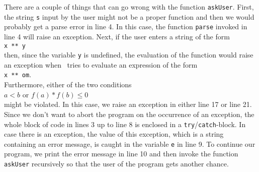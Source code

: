 There are a couple of things that can go wrong with the function \texttt{askUser}.  First,
the string \texttt{s} input by the user might not be a proper function and then
we would probably get a parse error in line 4.  In this case, the function \texttt{parse}
invoked in line 4 will raise an exception. Next, if the user enters a string of the form
\\[0.2cm]
\hspace*{1.3cm}
\texttt{x ** y}
\\[0.2cm]
then, since the variable \texttt{y} is undefined, the evaluation of the function would
raise an exception when \setlx\ tries to evaluate an expression of the form
\\[0.2cm]
\hspace*{1.3cm}
\texttt{x ** om}.
\\[0.2cm]
Furthermore, either of the two conditions
\\[0.2cm]
\hspace*{1.3cm}
$a < b$ \quad or \quad $f(a) * f(b) \leq 0$
\\[0.2cm]
might be violated.  In this case, we raise an exception in either line 17 or line 21.  
Since we don't want to abort the program on the occurrence of an exception, the whole block of
code in lines 3 up to line 8 is enclosed in a \texttt{try}/\texttt{catch}-block.  In case there is
an exception, the value of this exception, which is a string containing an error message, is
caught in the variable \texttt{e} in line 9.  To continue our program, we print the error message
in line 10 and then invoke the function \texttt{askUser} recursively so that the user of
the program gets another chance.

